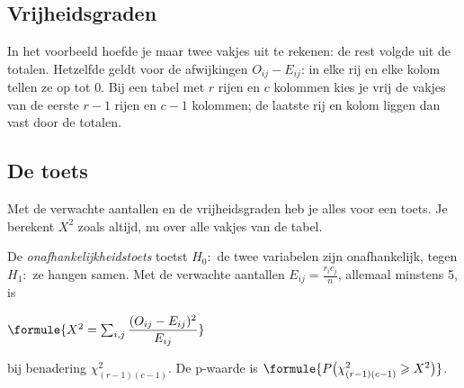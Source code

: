 \begin{oefeningen}
\end{oefeningen}

\subsection{Vrijheidsgraden}

In het voorbeeld hoefde je maar twee vakjes uit te rekenen: de rest volgde uit de totalen. Hetzelfde geldt voor de afwijkingen $O_{ij} - E_{ij}$: in elke rij en elke kolom tellen ze op tot 0. Bij een tabel met $r$ rijen en $c$ kolommen kies je vrij de vakjes van de eerste $r - 1$ rijen en $c - 1$ kolommen; de laatste rij en kolom liggen dan vast door de totalen.


\subsection{De toets}

Met de verwachte aantallen en de vrijheidsgraden heb je alles voor een toets. Je berekent $X^2$ zoals altijd, nu over alle vakjes van de tabel.

\begin{theorie}
De \emph{onafhankelijkheidstoets} toetst $H_0\colon$ de twee variabelen zijn onafhankelijk, tegen $H_1\colon$ ze hangen samen. Met de verwachte aantallen $E_{ij} = \frac{r_i c_j}{n}$, allemaal minstens 5, is

\vspace{1mm}
\qquad $\formule{X^2 = \sum_{i,j} \dfrac{(O_{ij} - E_{ij})^2}{E_{ij}}}$

\vspace{1mm}
bij benadering $\chi^2_{(r - 1)(c - 1)}$. De p-waarde is $\formule{P\bigl(\chi^2_{(r-1)(c-1)} \geqslant X^2\bigr)}$.
\end{theorie}

